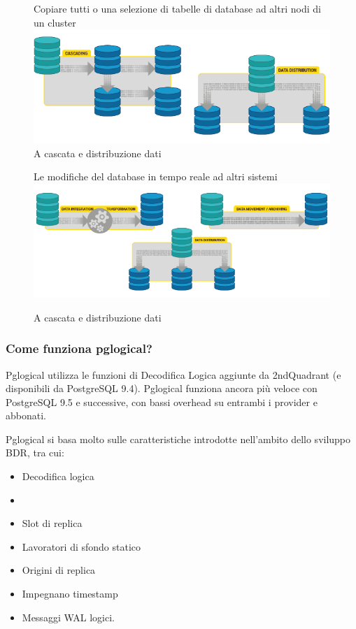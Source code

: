 \begin{figure}[htbp]
\centering
Copiare tutti o una selezione di tabelle di database ad altri nodi di un cluster
\includegraphics[scale=0.70]{img/pglogical_3.png}\\

\caption{A cascata e distribuzione dati \label{figura3} \cite{etichetta3}}
Le modifiche del database in tempo reale ad altri sistemi
\includegraphics[scale=0.70]{img/pglogical_4.png}\\

\caption{A cascata e distribuzione dati \label{figura4} \cite{etichetta3}}
\end{figure}

\subsubsection{Come funziona pglogical?}
Pglogical utilizza le funzioni di Decodifica Logica aggiunte da 2ndQuadrant (e disponibili da PostgreSQL 9.4). Pglogical funziona ancora pi\`{u} veloce con PostgreSQL 9.5 e successive, con bassi overhead su entrambi i provider e abbonati.

Pglogical si basa molto sulle caratteristiche introdotte nell'ambito dello sviluppo BDR, tra cui:

\begin{itemize}
\item
Decodifica logica
\item
\item
Slot di replica
\item
Lavoratori di sfondo statico
\item
Origini di replica
\item
Impegnano timestamp
\item
Messaggi WAL logici.\cite{etichetta3}
\end{itemize}

